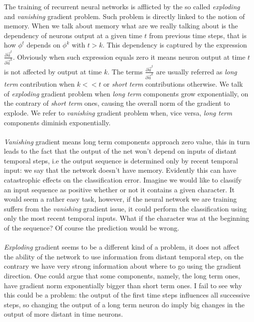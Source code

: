 The training of recurrent neural networks is afflicted by the so called \textit{exploding} and \textit{vanishing} gradient problem.
Such problem is directly linked to the notion of memory. When we talk about memory what are we really talking about is the dependency of neurons output at a given time $t$ from previous time steps,
that is how $\phi^t$ depends on $\phi^{k}$ with $t>k$. This dependency is captured by the expression $\frac{\partial \vec{a}^t}{\partial \vec{a}^k}$.
Obviously when such expression equals zero it means neuron output at time $t$ is not affected by output at time $k$.
The terms $\frac{\partial \vec{a}^t}{\partial \vec{a}^k}$ are usually referred as \textit{long term} contribution when $k<<t$ or \textit{short term} contributions
otherwise.
We talk of \textit{exploding} gradient problem when \textit{long term} components grow exponentially, on the contrary of \textit{short term} ones, causing
the overall norm of the gradient to explode.
We refer to \textit{vanishing} gradient problem when, vice versa, \textit{long term} components diminish exponentially.
\\\\
\textit{Vanishing} gradient means long term components approach zero value, this in turn leads to the fact that the output of the net won't depend on inputs of distant temporal steps, i.e the output
sequence is determined only by recent temporal input: we say that the network doesn't have memory. Evidently this can have catastrophic effects on the classification error. Imagine we would like
to classify an input sequence as positive whether or not it contains a given character. It would seem a rather easy task, however, if the neural network
we are training suffers from the \textit{vanishing} gradient issue, it could perform the classification using only the most recent temporal inputs. What if the character was at the beginning of the sequence? Of course
the prediction would be wrong.
\\\\
\textit{Exploding} gradient seems to be a different kind of a problem, it does not affect the ability of the network to use information from distant temporal step, on the contrary we have very strong
information about where to go using the gradient direction. One could argue that some components, namely, the long term ones, have gradient norm exponentially bigger than short term ones. I fail to see why this could be a problem:
the output of the first time steps influences all successive steps, so changing the output of a long term neuron do imply big changes in the output of more distant in time neurons.
